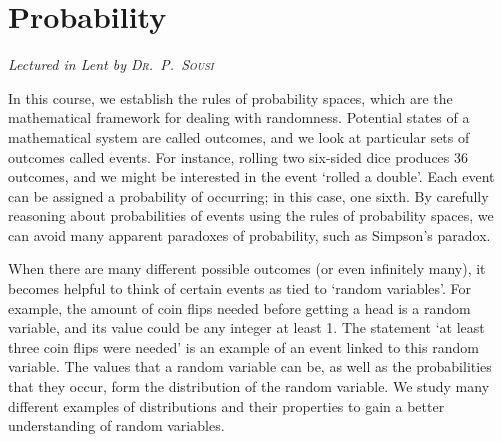 \chapter[Probability \\ \textnormal{\emph{Lectured in Lent \oldstylenums{2021} by \textsc{Dr.\ P.\ Sousi}}}]{Probability}
\emph{\Large Lectured in Lent  by \textsc{Dr.\ P.\ Sousi}}

In this course, we establish the rules of probability spaces, which are the mathematical framework for dealing with randomness.
Potential states of a mathematical system are called outcomes, and we look at particular sets of outcomes called events.
For instance, rolling two six-sided dice produces 36 outcomes, and we might be interested in the event `rolled a double'.
Each event can be assigned a probability of occurring; in this case, one sixth.
By carefully reasoning about probabilities of events using the rules of probability spaces, we can avoid many apparent paradoxes of probability, such as Simpson's paradox.

When there are many different possible outcomes (or even infinitely many), it becomes helpful to think of certain events as tied to `random variables'.
For example, the amount of coin flips needed before getting a head is a random variable, and its value could be any integer at least 1.
The statement `at least three coin flips were needed' is an example of an event linked to this random variable.
The values that a random variable can be, as well as the probabilities that they occur, form the distribution of the random variable.
We study many different examples of distributions and their properties to gain a better understanding of random variables.


